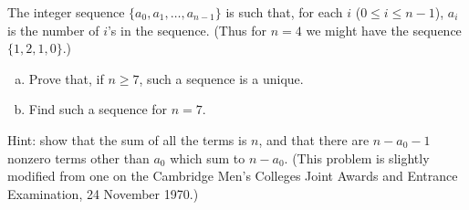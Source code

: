The integer sequence $\lbrace a_0, a_1, \dots, a_{n-1} \rbrace$ is such that,
for each $i$ ($0 \le i \le n - 1$), $a_i$ is the number of $i$'s in the
sequence. (Thus for $n = 4$ we might have the sequence $\lbrace 1, 2, 1, 0
\rbrace$.)

\begin{enumerate}[(a)]
\item Prove that, if $n \ge 7$, such a sequence is a unique.
\item Find such a sequence for $n = 7$.
\end{enumerate}

Hint: show that the sum of all the terms is $n$, and that there are $n - a_0 -
1$ nonzero terms other than $a_0$ which sum to $n - a_0$. (This problem is
slightly modified from one on the Cambridge Men's Colleges Joint Awards and
Entrance Examination, 24 November 1970.)
